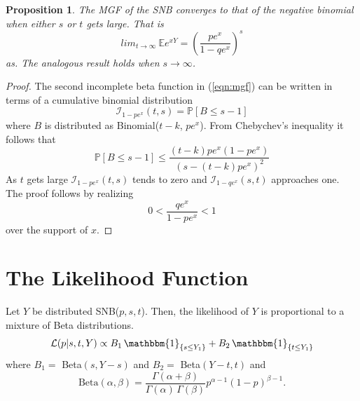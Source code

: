 \documentclass[sii]{ipart}
\newtheorem{prop}{Proposition}
\begin{document}
\begin{prop}
The MGF of the SNB converges to that of the negative binomial when either
$s$ or $t$ gets large. That is
\begin{equation*}
lim_{t\to\infty} \ \mathbb{E} e^{xY} = \left( \frac{pe^x}{1-qe^x} \right)^s
\end{equation*}
as. The analogous result holds when $s \rightarrow \infty$.
\end{prop}
\begin{proof}
The second incomplete beta function in (\ref{eqn:mgf}) can be written
in terms of a cumulative binomial distribution
\begin{equation*}
\mathcal{I}_{1-pe^x}(t, s) = \mathbb{P}\left[ B \leq s-1 \right]
\end{equation*}
where $B$ is distributed as
Binomial($t-k$, $pe^x$). From Chebychev's inequality %
it follows that
\begin{equation} \label{eqn:hoeffding}
\mathbb{P}\left[ B \leq s-1 \right] \leq 
  \frac{ (t-k) pe^x (1-pe^x) }{ \left(s - (t-k)pe^x\right)^2 }
\end{equation}
As $t$ gets large $\mathcal{I}_{1-pe^x}(t, s)$ tends to zero
and $\mathcal{I}_{1-qe^x}(s, t)$ approaches 
one. The proof follows by realizing 
\begin{equation*}
0 < \frac{qe^x}{1-pe^x} < 1
\end{equation*}
over the support of $x$.
\end{proof}


\section{The Likelihood Function} \label{sect:likelihood}

Let $Y$ be distributed SNB($p, s, t$). Then, the likelihood of $Y$ is proportional to a mixture of Beta distributions.
\begin{equation*} \label{eqn:likelihood}
\mathcal{L} (p | s, t, Y) \propto B_1 \, \mathbbm{1}_{\{s \leq Y_1\}} + B_2 \, \mathbbm{1}_{\{t \leq Y_1 \}}
\end{equation*}
where $B_1 =$ Beta$\left(s, Y - s\right)$ and $B_2 =$ Beta$\left(Y - t, t\right)$ and
\begin{equation*}
\text{Beta}\left( \alpha, \beta \right) = \frac{\Gamma(\alpha+\beta)}{\Gamma(\alpha)\, \Gamma(\beta)} 
p^{\alpha-1} (1-p)^{\beta-1}.
\end{equation*}
\end{document}
